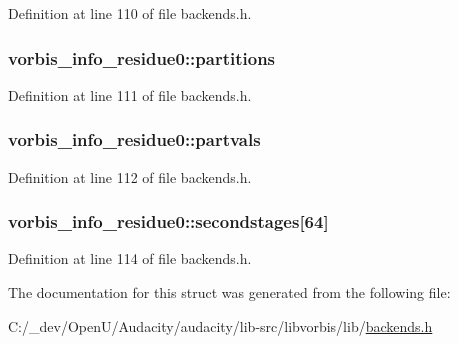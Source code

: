Definition at line 110 of file backends.\+h.

\subsubsection[{\texorpdfstring{partitions}{partitions}}]{ vorbis\+\_\+info\+\_\+residue0\+::partitions}\hypertarget{structvorbis__info__residue0_a466dc773410639c9786d33301cac61ed}{}\label{structvorbis__info__residue0_a466dc773410639c9786d33301cac61ed}


Definition at line 111 of file backends.\+h.

\subsubsection[{\texorpdfstring{partvals}{partvals}}]{ vorbis\+\_\+info\+\_\+residue0\+::partvals}\hypertarget{structvorbis__info__residue0_a44650904dcc80ac19b1d3a0ee910be62}{}\label{structvorbis__info__residue0_a44650904dcc80ac19b1d3a0ee910be62}


Definition at line 112 of file backends.\+h.

\subsubsection[{\texorpdfstring{secondstages}{secondstages}}]{ vorbis\+\_\+info\+\_\+residue0\+::secondstages\mbox{[}64\mbox{]}}\hypertarget{structvorbis__info__residue0_a744daf253a651d2e13a3f80d4220c28e}{}\label{structvorbis__info__residue0_a744daf253a651d2e13a3f80d4220c28e}


Definition at line 114 of file backends.\+h.



The documentation for this struct was generated from the following file\+:\begin{DoxyCompactItemize}
\item 
C\+:/\+\_\+dev/\+Open\+U/\+Audacity/audacity/lib-\/src/libvorbis/lib/\hyperlink{backends_8h}{backends.\+h}\end{DoxyCompactItemize}
